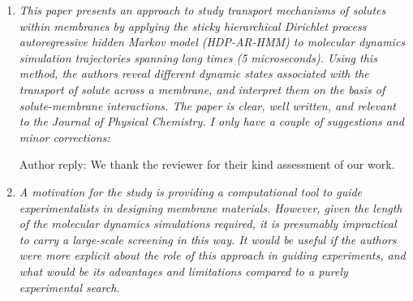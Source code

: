 \documentclass{article}
\begin{document}
\begin{enumerate}[label={Comment \theenumi :}, leftmargin=3.9\parindent]  

    \item \textit{This paper presents an approach to study transport mechanisms of solutes within
    membranes by applying the sticky hierarchical Dirichlet process autoregressive hidden Markov model
    (HDP-AR-HMM) to molecular dynamics simulation trajectories spanning long times (5 microseconds). 
    Using this method, the authors reveal different dynamic states associated with the transport of 
    solute across a membrane, and interpret them on the basis of solute-membrane interactions. The 
    paper is clear, well written, and relevant to the Journal of Physical Chemistry. I only have a 
    couple of suggestions and minor corrections:}
    
    Author reply: We thank the reviewer for their kind assessment of our work.

    \item \textit{A motivation for the study is providing a computational tool to guide experimentalists
    in designing membrane materials. However, given the length of the molecular dynamics simulations 
    required, it is presumably impractical to carry a large-scale screening in this way. It would be 
    useful if the authors were more explicit about the role of this approach in guiding experiments, 
    and what would be its advantages and limitations compared to a purely experimental search.}
    

\end{enumerate}
\end{document}
